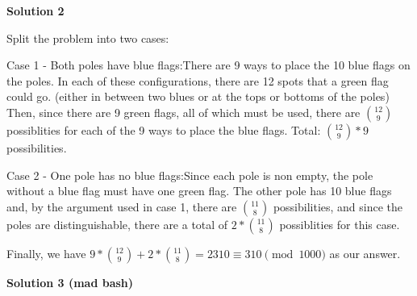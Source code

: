 \begin{enumerate}
 



\textbf{Solution 2}

Split the problem into two cases:

 Case 1 - Both poles have blue flags:There are 9 ways to place the 10 blue flags on the poles. In each of these configurations, there are 12 spots that a green flag could go. (either in between two blues or at the tops or bottoms of the poles) Then, since there are 9 green flags, all of which must be used, there are ${12\choose9}$ possiblities for each of the 9 ways to place the blue flags. Total: ${12\choose9}*9$ possibilities.

 Case 2 - One pole has no blue flags:Since each pole is non empty, the pole without a blue flag must have one green flag. The other pole has 10 blue flags and, by the argument used in case 1, there are ${11\choose8}$ possibilities, and since the poles are distinguishable, there are a total of $2*{11\choose8}$ possiblities for this case.

 Finally, we have $9*{12\choose9}+2*{11\choose8}=2310 \equiv \boxed{310} \pmod{1000}$ as our answer.

 



\textbf{Solution 3 (mad bash)}


\end{enumerate}

